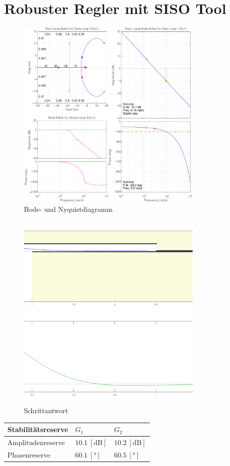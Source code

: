\section{Robuster Regler mit SISO Tool}
\begin{figure}[h!]
    \centering
    \includegraphics[width=0.8\textwidth]{07/diag_siso.pdf}
    \caption{Bode- und Nyquistdiagramm}
    \label{fig:07a}
\end{figure}
\begin{figure}[h!]
    \centering
    \includegraphics[width=0.8\textwidth]{07/step_siso.pdf}
    \caption{Schrittantwort}
    \label{fig:07b}
\end{figure}
\begin{table}[h!]
    \centering
    \begin{tabular}{l|ll}
        Stabilitätsreserve  & $G_1$                     & $G_2$ \\
        \hline
        Amplitudenreserve   & $10.1~[\si{\deci\bel}]$   & $10.2~[\si{\deci\bel}]$ \\
        Phasenreserve       & $60.1~[\si{\degree}]$     & $60.5~[\si{\degree}]$ \\
    \end{tabular}
\end{table}

